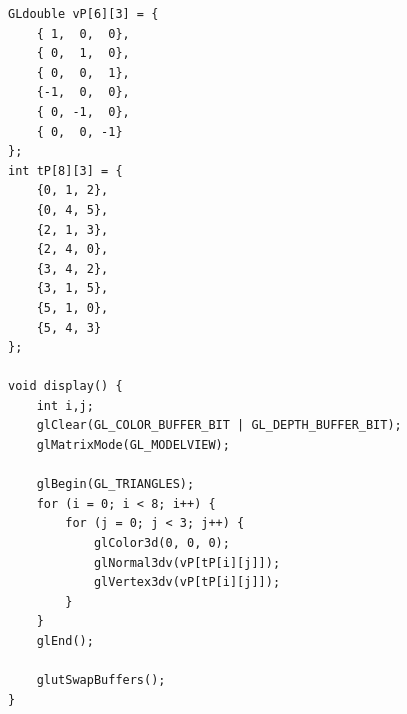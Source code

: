 \documentclass{jsarticle}
\begin{document}
        \begin{lstlisting}[caption=正八面体を表示するプログラム, label=src:octahedron]
GLdouble vP[6][3] = {
    { 1,  0,  0},
    { 0,  1,  0},
    { 0,  0,  1},
    {-1,  0,  0},
    { 0, -1,  0},
    { 0,  0, -1}
};
int tP[8][3] = {
    {0, 1, 2},
    {0, 4, 5},
    {2, 1, 3},
    {2, 4, 0},
    {3, 4, 2},
    {3, 1, 5},
    {5, 1, 0},
    {5, 4, 3}
};

void display() {
    int i,j;
    glClear(GL_COLOR_BUFFER_BIT | GL_DEPTH_BUFFER_BIT);
    glMatrixMode(GL_MODELVIEW);

    glBegin(GL_TRIANGLES);
    for (i = 0; i < 8; i++) {
        for (j = 0; j < 3; j++) {
            glColor3d(0, 0, 0);
            glNormal3dv(vP[tP[i][j]]);
            glVertex3dv(vP[tP[i][j]]);
        }
    }
    glEnd();

    glutSwapBuffers();
}
\end{lstlisting}
\end{document}
